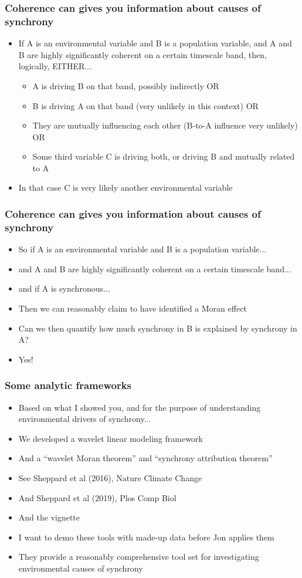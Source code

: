 \documentclass{beamer}
\begin{document}
\begin{frame}
\frametitle{Coherence can gives you information about causes of synchrony}
\begin{itemize}
\item If A is an environmental variable and B is a population variable, and A and B are highly significantly
coherent on a certain timescale band, then, logically, EITHER...
\begin{itemize}
\item A is driving B on that band, possibly indirectly OR
\item B is driving A on that band (very unlikely in this context) OR
\item They are mutually influencing each other (B-to-A influence very unlikely) OR
\item Some third variable C is driving both, or driving B and mutually related to A
\end{itemize}
\item In that case C is very likely another environmental variable
\end{itemize}
\end{frame}

\begin{frame}
\frametitle{Coherence can gives you information about causes of synchrony}
\begin{itemize}
\item So if A is an environmental variable and B is a population variable...
\item and A and B are highly significantly coherent on a certain timescale band...
\item and if A is synchronous...
\item Then we can reasonably claim to have identified a Moran effect
\item Can we then quantify how much synchrony in B is explained by synchrony in A?
\item Yes!
\end{itemize}
\end{frame}

\begin{frame}
\frametitle{Some analytic frameworks}
\begin{itemize}
\item Based on what I showed you, and for the purpose of understanding environmental drivers of synchrony...
\item We developed a wavelet linear modeling framework
\item And a ``wavelet Moran theorem'' and ``synchrony attribution theorem''
\item See Sheppard et al (2016), Nature Climate Change
\item And Sheppard et al (2019), Plos Comp Biol
\item And the vignette
\item I want to demo these tools with made-up data before Jon applies them
\item They provide a reasonably comprehensive tool set for investigating environmental causes of synchrony
\end{itemize}
\end{frame}
\end{document}
